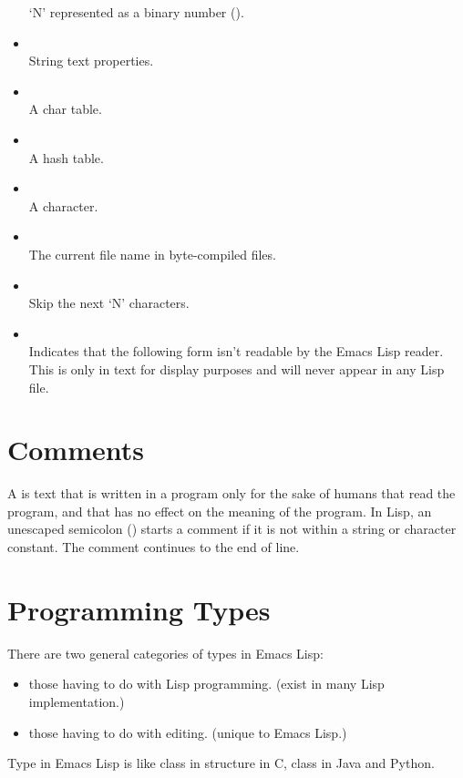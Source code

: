 \begin{itemize}
  `N' represented as a binary number ().
\item {}\\
  String text properties.
\item \keyword{\#\textasciicircum{}}\\
  A char table.
\item {}\\
  A hash table.
\item {}\\
  A character.
\item \keyword{\#\$}\\
  The current file name in byte-compiled files.
\item {}\\
  Skip the next ‘N’ characters.
\item {} \\
  Indicates that the following form isn’t readable by the Emacs Lisp reader. This is only in text for display purposes and will never appear in any Lisp file.
\end{itemize}


\section{Comments}
\label{sec:comments}

A  is text that is written in a program only for the sake of humans that read the program, and that has no effect on the meaning of the program.
In Lisp, an unescaped semicolon (\keyword{;}) starts a comment if it is not within a string or character constant.
The comment continues to the end of line.




\section{Programming Types}
\label{sec:programming-types}

There are two general categories of types in Emacs Lisp:
\begin{itemize}
\item those having to do with Lisp programming. (exist in many Lisp implementation.)
\item those having to do with editing. (unique to Emacs Lisp.)
\end{itemize}

Type in Emacs Lisp is like class in structure in C, class in Java and Python.



